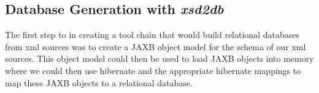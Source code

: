 \subsection{Database Generation with \emph{xsd2db}}
\label{xsd2db}
The first step to in creating a tool chain that would build relational databases from xml sources was to create a JAXB object model for the schema of our xml sources.  This object model could then be used to load JAXB objects into memory where we could then use hibernate and the appropriate hibernate mappings to map these JAXB objects to a relational database.  